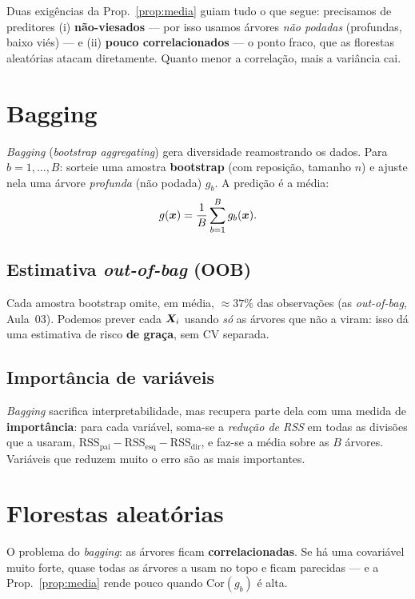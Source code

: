 \documentclass[11pt,a4paper]{article}
\begin{document}
\begin{ideia}
Duas exigências da Prop.~\ref{prop:media} guiam tudo o que segue: precisamos de
preditores (i) \textbf{não-viesados} --- por isso usamos árvores \emph{não podadas}
(profundas, baixo viés) --- e (ii) \textbf{pouco correlacionados} --- o ponto fraco,
que as florestas aleatórias atacam diretamente. Quanto menor a correlação, mais a
variância cai.
\end{ideia}

\section{Bagging}
\emph{Bagging} (\emph{bootstrap aggregating}) gera diversidade reamostrando os
dados. Para $b=1,\dots,B$: sorteie uma amostra \textbf{bootstrap} (com reposição,
tamanho $n$) e ajuste nela uma árvore \emph{profunda} (não podada) $g_b$. A predição
é a média:
\begin{equation}\label{eq:bagging}
  g(\bm{x}) = \frac1B\sum_{b=1}^B g_b(\bm{x}).
\end{equation}

\subsection{Estimativa \emph{out-of-bag} (OOB)}
Cada amostra bootstrap omite, em média, $\approx 37\%$ das observações (as
\emph{out-of-bag}, Aula~03). Podemos prever cada $\bm{X}_i$ usando \emph{só} as árvores
que não a viram: isso dá uma estimativa de risco \textbf{de graça}, sem CV
separada.

\subsection{Importância de variáveis}
\emph{Bagging} sacrifica interpretabilidade, mas recupera parte dela com uma medida
de \textbf{importância}: para cada variável, soma-se a \emph{redução de RSS} em
todas as divisões que a usaram, $\mathrm{RSS}_{\text{pai}}
-\mathrm{RSS}_{\text{esq}}-\mathrm{RSS}_{\text{dir}}$, e faz-se a média sobre as
$B$ árvores. Variáveis que reduzem muito o erro são as mais importantes.

\section{Florestas aleatórias}
O problema do \emph{bagging}: as árvores ficam \textbf{correlacionadas}. Se há uma
covariável muito forte, quase todas as árvores a usam no topo e ficam parecidas ---
e a Prop.~\ref{prop:media} rende pouco quando $\mathrm{Cor}(g_b)$ é alta.
\end{document}

